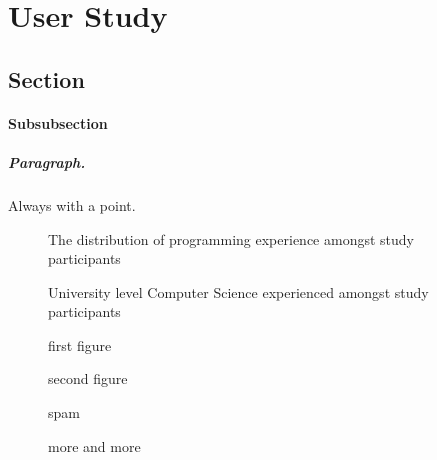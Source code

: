 \chapter{User Study}
\section{Section}
%
\subsubsection{Subsubsection}

\paragraph{Paragraph.} Always with a point.

\begin{figure}[H]
	\scalebox{0.75}{}
	\caption{The distribution of programming experience amongst study participants}
	\label{fig:programmingexp}
\end{figure}

\begin{figure}[H]
	\scalebox{1}{}
	\caption{University level Computer Science experienced amongst study participants}
	\label{fig:uniexp}
\end{figure}

\begin{figure}[H]
	\centering
	\begin{minipage}{0.45\textwidth}
		\centering
		\scalebox{0.7}{}
		\caption{first figure}
    \end{minipage}\hspace{-1em}
	\begin{minipage}{0.45\textwidth}
		\centering
		\scalebox{0.7}{}
		\caption{second figure}
	\end{minipage}
\end{figure}



\begin{figure}[H]
	\scalebox{0.75}{}
	\caption{spam}
	\label{fig:uniexp}
\end{figure}

\begin{figure}[H]
	\scalebox{0.75}{}
	\caption{more and more}
	\label{fig:moreandmore}
\end{figure}

